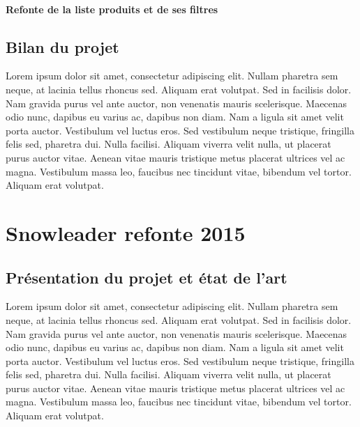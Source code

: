 \documentclass[a4paper,11pt,twoside]{report}
\begin{document}
	\paragraph*{Refonte de la liste produits et de ses filtres}
	
    \subsection*{Bilan du projet}
    Lorem ipsum dolor sit amet, consectetur adipiscing elit. Nullam pharetra sem neque, at lacinia tellus rhoncus sed. Aliquam erat volutpat. Sed in facilisis dolor. Nam gravida purus vel ante auctor, non venenatis mauris scelerisque. Maecenas odio nunc, dapibus eu varius ac, dapibus non diam. Nam a ligula sit amet velit porta auctor. Vestibulum vel luctus eros. Sed vestibulum neque tristique, fringilla felis sed, pharetra dui. Nulla facilisi. Aliquam viverra velit nulla, ut placerat purus auctor vitae. Aenean vitae mauris tristique metus placerat ultrices vel ac magna. Vestibulum massa leo, faucibus nec tincidunt vitae, bibendum vel tortor. Aliquam erat volutpat.
    
        \newpage
    
  \section{Snowleader refonte 2015}
    \subsection*{Présentation du projet et état de l'art}
    Lorem ipsum dolor sit amet, consectetur adipiscing elit. Nullam pharetra sem neque, at lacinia tellus rhoncus sed. Aliquam erat volutpat. Sed in facilisis dolor. Nam gravida purus vel ante auctor, non venenatis mauris scelerisque. Maecenas odio nunc, dapibus eu varius ac, dapibus non diam. Nam a ligula sit amet velit porta auctor. Vestibulum vel luctus eros. Sed vestibulum neque tristique, fringilla felis sed, pharetra dui. Nulla facilisi. Aliquam viverra velit nulla, ut placerat purus auctor vitae. Aenean vitae mauris tristique metus placerat ultrices vel ac magna. Vestibulum massa leo, faucibus nec tincidunt vitae, bibendum vel tortor. Aliquam erat volutpat.
\end{document}
